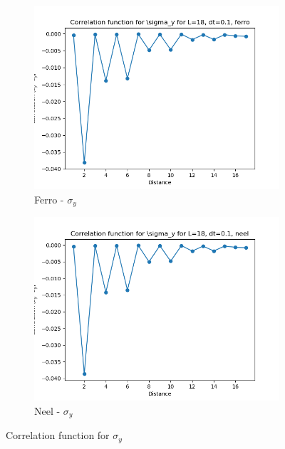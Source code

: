 \documentclass[12pt]{article}
\begin{document}
\begin{figure}[h!]
  \centering
  \begin{subfigure}[b]{0.4\textwidth}
    \includegraphics[width=\textwidth]{p4_1_correlation_sigma_y_L_18_dt_0.1_name_ferro.png}
    \caption{Ferro - $\sigma_y$}
  \end{subfigure}
  \hfill
  \begin{subfigure}[b]{0.4\textwidth}
    \includegraphics[width=\textwidth]{p4_1_correlation_sigma_y_L_18_dt_0.1_name_neel.png}
    \caption{Neel - $\sigma_y$}
  \end{subfigure}
  \caption{Correlation function for $\sigma_y$}
\end{figure}
\end{document}
